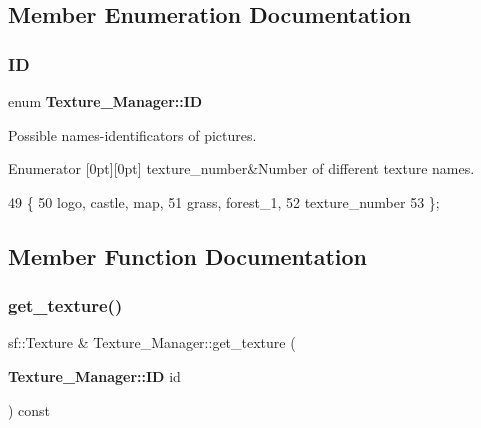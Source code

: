 \subsection{Member Enumeration Documentation}
\mbox{\label{class_texture___manager_ad63782cc856b6b2f5f2d5a50446ca589}} 
\subsubsection{ID}
{\footnotesize\ttfamily enum \textbf{ Texture\+\_\+\+Manager\+::\+ID}}



Possible names-\/identificators of pictures. 

\begin{DoxyEnumFields}{Enumerator}
[0pt][0pt]{}\mbox{\label{class_texture___manager_ad63782cc856b6b2f5f2d5a50446ca589a556b14f5a3303471af929dcb18cf9ca4}} 
texture\+\_\+number&Number of different texture names. \\
\hline

\end{DoxyEnumFields}

\begin{DoxyCode}
49             \{
50                 logo, castle, map,
51                 grass, forest\_1,
52                 texture_number          
53             \};
\end{DoxyCode}


\subsection{Member Function Documentation}
\mbox{\label{class_texture___manager_a0af52a4c629ad3fab88437c7ff13ef3c}} 
\subsubsection{get\+\_\+texture()}
{\footnotesize\ttfamily sf\+::\+Texture \& Texture\+\_\+\+Manager\+::get\+\_\+texture (\begin{DoxyParamCaption}\item[{\textbf{ Texture\+\_\+\+Manager\+::\+ID}}]{id }\end{DoxyParamCaption}) const\hspace{0.3cm}{\ttfamily [noexcept]}}

